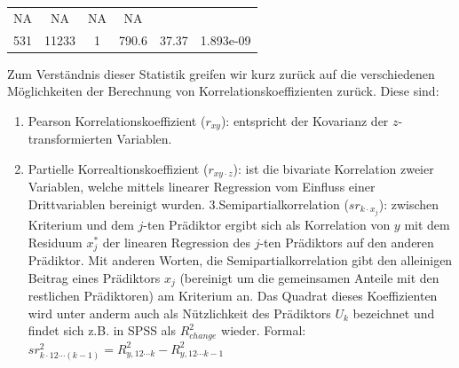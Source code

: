 \documentclass[]{article}
\providecommand{\tightlist}{%
  \setlength{\itemsep}{0pt}\setlength{\parskip}{0pt}}
\begin{document}
\begin{longtable}[]{@{}cccccc@{}}
\begin{minipage}[t]{0.06\columnwidth}
NA\strut
\end{minipage} & \begin{minipage}[t]{0.14\columnwidth}\centering\strut
NA\strut
\end{minipage} & \begin{minipage}[t]{0.09\columnwidth}\centering\strut
NA\strut
\end{minipage} & \begin{minipage}[t]{0.13\columnwidth}\centering\strut
NA\strut
\end{minipage}\tabularnewline
\begin{minipage}[t]{0.10\columnwidth}\centering\strut
531\strut
\end{minipage} & \begin{minipage}[t]{0.09\columnwidth}\centering\strut
11233\strut
\end{minipage} & \begin{minipage}[t]{0.06\columnwidth}\centering\strut
1\strut
\end{minipage} & \begin{minipage}[t]{0.14\columnwidth}\centering\strut
790.6\strut
\end{minipage} & \begin{minipage}[t]{0.09\columnwidth}\centering\strut
37.37\strut
\end{minipage} & \begin{minipage}[t]{0.13\columnwidth}\centering\strut
1.893e-09\strut
\end{minipage}\tabularnewline
\bottomrule
\end{longtable}

Zum Verständnis dieser Statistik greifen wir kurz zurück auf die
verschiedenen Möglichkeiten der Berechnung von Korrelationskoeffizienten
zurück. Diese sind:

\begin{enumerate}
\def\labelenumi{\arabic{enumi}.}
\tightlist
\item
  Pearson Korrelationskoeffizient (\(r_{xy}\)): entspricht der Kovarianz
  der \(z\)-transformierten Variablen.
\item
  Partielle Korrealtionskoeffizient (\(r_{xy \cdot z}\)): ist die
  bivariate Korrelation zweier Variablen, welche mittels linearer
  Regression vom Einfluss einer Drittvariablen bereinigt wurden.
  3.Semipartialkorrelation (\(sr_{k \cdot x_j}\)): zwischen Kriterium
  und dem \(j\)-ten Prädiktor ergibt sich als Korrelation von \(y\) mit
  dem Residuum \(x_j^*\) der linearen Regression des \(j\)-ten
  Prädiktors auf den anderen Prädiktor. Mit anderen Worten, die
  Semipartialkorrelation gibt den alleinigen Beitrag eines Prädiktors
  \(x_j\) (bereinigt um die gemeinsamen Anteile mit den restlichen
  Prädiktoren) am Kriterium an. Das Quadrat dieses Koeffizienten wird
  unter anderm auch als Nützlichkeit des Prädiktors \(U_k\) bezeichnet
  und findet sich z.B. in SPSS als \(R^2_{change}\) wieder. Formal:
  \(sr_{k \cdot 12 \cdots (k-1)}^2 = R_{y, 12 \cdots k}^2 - R_{y, 12 \cdots k-1}^2\)
\end{enumerate}
\end{document}
